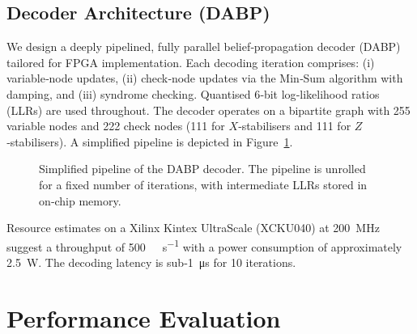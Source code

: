 \documentclass[conference]{IEEEtran}
\begin{document}
    \subsection{Decoder Architecture (DABP)}

    We design a deeply pipelined, fully parallel belief‑propagation decoder (DABP) tailored for FPGA implementation.  
Each decoding iteration comprises: (i) variable‑node updates, (ii) check‑node updates via the Min‑Sum algorithm with 
damping, and (iii) syndrome checking.  Quantised 6‑bit log‑likelihood ratios (LLRs) are used throughout.  The decoder 
operates on a bipartite graph with 255 variable nodes and 222 check nodes (111 for $X$‑stabilisers and 111 for 
$Z$‑stabilisers).  A simplified pipeline is depicted in Figure~\ref{fig:dabp}.

    \begin{figure}[t]
      \centering
      \caption{Simplified pipeline of the DABP decoder.  The pipeline is unrolled for a fixed number of iterations, with
  intermediate LLRs stored in on‑chip memory.}
      \label{fig:dabp}
    \end{figure}

    Resource estimates on a Xilinx Kintex UltraScale (XCKU040) at \SI{200}{\mega\hertz} suggest a throughput of 
\SI{500}{\mega\codeword\per\second} with a power consumption of approximately \SI{2.5}{\watt}.  The decoding latency is 
sub‑\SI{1}{\micro\second} for 10 iterations.

    \section{Performance Evaluation}
\end{document}
